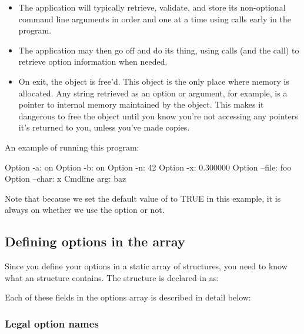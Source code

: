 \begin{itemize}
\item The application will typically retrieve, validate, and store its
      non-optional command line arguments in order and one at a time
      using  calls early in the program.
  
\item The application may then go off and do its thing, using
       calls (and the  call) to
      retrieve option information when needed.

\item On exit, the  object is free'd. This 
      object is the only place where memory is allocated. Any string
      retrieved as an option or argument, for example, is a pointer
      to internal memory maintained by the object. This makes it
      dangerous to free the object until you know you're not accessing
      any pointers it's returned to you, unless you've made copies.
\end{itemize}

An example of running this program:
\begin{cchunk}
   Option -a:      on
   Option -b:      on
   Option -n:      42
   Option -x:      0.300000
   Option --file:  foo
   Option --char:  x
   Cmdline arg:    baz
\end{cchunk}

Note that because we set the default value of  to TRUE in
this example, it is always on whether we use the  option or
not.





\subsection{Defining options in the  array}

Since you define your options in a static array of
 structures, you need to know what an
 structure contains.  The 
structure is declared in  as:



Each of these fields in the options array is described in detail below:

   \subsubsection{Legal option names}

